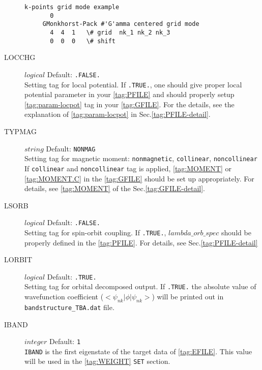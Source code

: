 \documentclass[a4paper,12pt]{scrartcl}
\makeatletter
\def\namedlabel#1#2{\begingroup
    #2%
    \def\@currentlabel{#2}%
    \phantomsection\label{#1}\endgroup
}
\makeatother
\begin{document}
\begin{description}
\begin{Verbatim}[commandchars=\\\{\},gobble=4, frame=single, framesep=2mm, 
            label= KPOINTS\_BAND $line$ $mode$ example, 
            labelposition=bottomline]
        \end{Verbatim}

        \begin{Verbatim}[commandchars=\\\{\},gobble=4, frame=single, framesep=2mm, 
            label= KPOINTS\_BAND $grid$ $mode$ example, 
            labelposition=bottomline]
     k-points grid mode example
       0 
     GMonkhorst-Pack #'G'amma centered grid mode
       4  4  1   \# grid  nk_1 nk_2 nk_3
       0  0  0   \# shift
        \end{Verbatim}

    \item[\namedlabel{tag:LOCCHG}{LOCCHG}] $logical$ Default: \texttt{.FALSE.}\\
        Setting tag for local potential.
        If \texttt{.TRUE.}, one should give proper local potential parameter 
		in your \ref{tag:PFILE} and should properly setup \ref{tag:param-locpot} 
		tag in your \ref{tag:GFILE}. For the details, see the explanation of
		\ref{tag:param-locpot} in Sec.\ref{tag:PFILE-detail}.

    \item[\namedlabel{tag:TYPMAG}{TYPMAG}] $string$ Default: \texttt{NONMAG}\\
        Setting tag for magnetic moment: \texttt{nonmagnetic}, \texttt{collinear}, 
		\texttt{noncollinear}
		If \texttt{collinear} and \texttt{noncollinear} tag is applied, 
		\ref{tag:MOMENT} or \ref{tag:MOMENT.C} in the \ref{tag:GFILE}
		should be set up appropriately.
		For details, see \ref{tag:MOMENT} of the Sec.\ref{tag:GFILE-detail}.

    \item[\namedlabel{tag:LSORB}{LSORB}] $logical$ Default: \texttt{.FALSE.}\\
        Setting tag for spin-orbit coupling. 
		If \texttt{.TRUE.}, $lambda\_orb\_spec$ should be properly defined in the
		\ref{tag:PFILE}. For details, see Sec.\ref{tag:PFILE-detail}

    \item[\namedlabel{tag:LORBIT}{LORBIT}] $logical$ Default: \texttt{.TRUE.}\\
        Setting tag for orbital decomposed output.
		If \texttt{.TRUE.} the absolute value of wavefunction coefficient 
		($<\psi_{nk}|$$\phi$$|\psi_{nk}>$) will be 
		printed out in \texttt{bandstructure\_TBA.dat} file.

    \item[\namedlabel{tag:IBAND}{IBAND}] $integer$ Default: \texttt{1}\\
		\texttt{IBAND} is the first eigenstate of the target data of 
		\ref{tag:EFILE}. This value will be used in the \ref{tag:WEIGHT}
		\texttt{SET} section.


\end{description}
\end{document}
